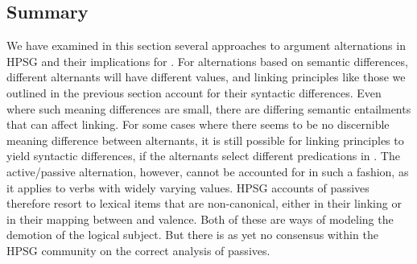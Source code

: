\documentclass[output=paper,biblatex,babelshorthands,newtxmath,draftmode,colorlinks, citecolor=brown]{langscibook}
\begin{document}
\subsection{Summary}

We have examined in this section several approaches to argument alternations in HPSG and their implications for \argst.
For alternations based on semantic differences, different alternants will have different  values, and linking principles like those we outlined in the previous section account for their syntactic differences.
Even where such meaning differences are small, there are differing semantic entailments that can affect linking.
For some cases where there seems to be no discernible meaning difference between alternants, it is still possible for linking principles to yield syntactic differences, if the alternants select different  predications in .
The active/passive alternation, however, cannot be accounted for in such a fashion, as it applies to verbs with widely varying  values.
HPSG accounts of passives therefore resort to lexical items that are non-canonical, either in their linking or in their mapping between \argst and valence.
Both of these are ways of modeling the demotion of the logical subject.
But there is as yet no consensus within the HPSG community on the correct analysis of passives.


\end{document}
